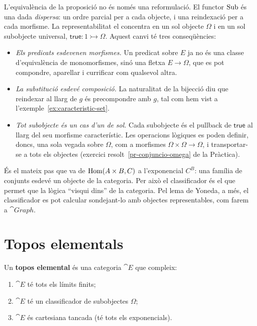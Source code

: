 \begin{observacio}\label{obs:sub-representable}
L'equivalència de la proposició no és només una reformulació. El functor $\operatorname{Sub}$ és una dada \emph{dispersa}: un ordre parcial per a cada objecte, i una reindexació per a cada morfisme. La representabilitat el concentra en un sol objecte $\Omega$ i en un sol subobjecte universal, $\mathsf{true}\colon 1\rightarrowtail\Omega$. Aquest canvi té tres conseqüències:
\begin{itemize}
\item \emph{Els predicats esdevenen morfismes.} Un predicat sobre $E$ ja no és una classe d'equivalència de monomorfismes, sinó una fletxa $E\to\Omega$, que es pot compondre, aparellar i currificar com qualsevol altra.
\item \emph{La substitució esdevé composició.} La naturalitat de la bijecció diu que reindexar al llarg de $g$ és precompondre amb $g$, tal com hem vist a l'exemple~\ref{ex:caracteristic-set}.
\item \emph{Tot subobjecte és un cas d'un de sol.} Cada subobjecte és el pullback de $\mathsf{true}$ al llarg del seu morfisme característic. Les operacions lògiques es poden definir, doncs, una sola vegada sobre $\Omega$, com a morfismes $\Omega\times\Omega\to\Omega$, i transportar-se a tots els objectes (exercici resolt~\ref{pr-conjuncio-omega} de la Pràctica).
\end{itemize}
És el mateix pas que va de $\operatorname{Hom}(A\times B,C)$ a l'exponencial $C^B$: una família de conjunts esdevé un objecte de la categoria. Per això el classificador és el que permet que la lògica \enquote{visqui dins} de la categoria. Pel lema de Yoneda, a més, el classificador es pot calcular sondejant-lo amb objectes representables, com farem a $\cat{Graph}$.
\end{observacio}

\section{Topos elementals}

\begin{definicio}
\label{def:topos}
Un \textbf{topos elemental} és una categoria $\cat{E}$ que compleix:
\begin{enumerate}
\item $\cat{E}$ té tots els límits finits;
\item $\cat{E}$ té un classificador de subobjectes $\Omega$;
\item $\cat{E}$ és cartesiana tancada (té tots els exponencials).
\end{enumerate}
\end{definicio}

